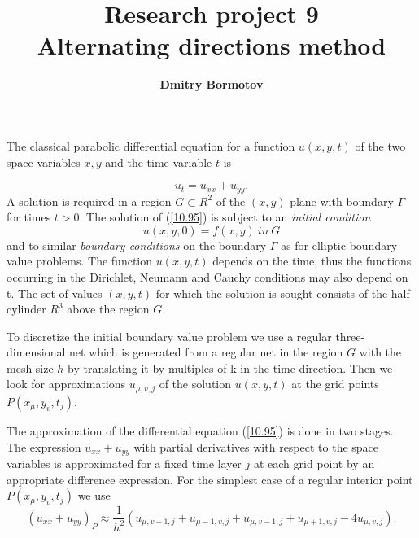 \documentclass[11pt]{article}
\title{\bf{Research project 9 \\ Alternating directions method}}
\author{\bf Dmitry Bormotov}
\date{}
\begin{document}
\maketitle

The classical parabolic differential equation for a function
$u(x,y,t)$ of the two space variables $x,y$ and the time variable $t$
is

\begin{equation}
u_{t} = u_{xx} + u_{yy}.  \label{10.95}
\end{equation}
A solution is required in a region $G \subset R^{2}$ of the $(x,y)$
plane with boundary $\Gamma$ for times $t>0$. The solution of
(\ref{10.95}) is subject to an {\em initial condition} 
\begin{equation}
u(x,y,0) = f(x,y) \ in \ G  \label{10.96}
\end{equation}
and to similar {\em boundary conditions} on the boundary $\Gamma$ as for
elliptic boundary value problems. The function $u(x,y,t)$ depends on
the time, thus the functions occurring in the Dirichlet, Neumann and
Cauchy conditions may also depend on t. The set of values $(x,y,t)$
for which the solution is sought consists of the half cylinder $R^{3}$
above the region $G$. 

To discretize the initial boundary value problem we use a regular
three-dimensional net which is generated from a regular net in the
region $G$ with the mesh size $h$ by translating it by multiples of k
in the time direction. Then we look for approximations $u_{\mu,v,j}$
of the solution $u(x,y,t)$ at the grid points $P(x_{\mu},y_{v},t_{j})$.

The approximation of the differential equation (\ref{10.95}) is done
in two stages.  The expression $u_{xx}+u_{yy}$ with partial
derivatives with respect to the space variables is approximated for a
fixed time layer $j$ at each grid point by an appropriate difference
expression. For the simplest case of a regular interior point
$P(x_{\mu},y_{v},t_{j})$ we use 
\[ (u_{xx}+u_{yy})_{P} \approx \frac{1}{h^2}
(u_{\mu,v+1,j}+u_{\mu-1,v,j}+u_{\mu,v-1,j}+u_{\mu+1,v,j}-4u_{\mu,v,j}).
\]
\end{document}

